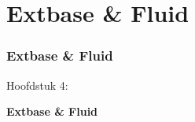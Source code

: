 %

\section{Extbase \& Fluid}
\begin{frame}[fragile]
	\frametitle{Extbase \& Fluid}

	\begin{center}\huge{Hoofdstuk 4:}\end{center}
	\begin{center}\huge{\color{typo3darkgrey}\textbf{Extbase \& Fluid}}\end{center}

\end{frame}


